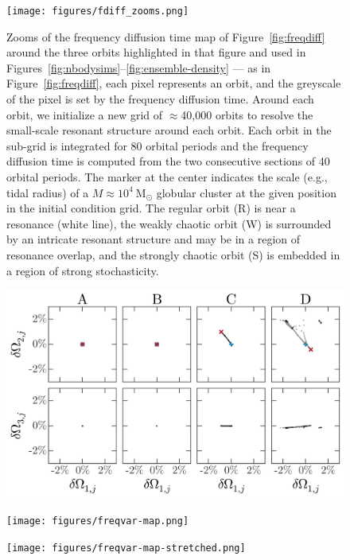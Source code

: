 \documentclass[letterpaper,12pt,preprint]{aastex}
\newcommand{\msun}{\ensuremath{\mathrm{M}_\odot}}
\begin{document}
\clearpage
\begin{figure}[p]
\begin{center}
\texttt{[image: figures/fdiff\_zooms.png]}
\caption{Zooms of the frequency diffusion time map of Figure~\ref{fig:freqdiff} around the three orbits highlighted in that figure and used in Figures~\ref{fig:nbodysims}--\ref{fig:ensemble-density} --- as in Figure~\ref{fig:freqdiff}, each pixel represents an orbit, and the greyscale of the pixel is set by the frequency diffusion time. Around each orbit, we initialize a new grid of $\approx$40,000 orbits to resolve the small-scale resonant structure around each orbit. Each orbit in the sub-grid is integrated for 80 orbital periods and the frequency diffusion time is computed from the two consecutive sections of 40 orbital periods. The marker at the center indicates the scale (e.g., tidal radius) of a $M \approx 10^4~\msun$ globular cluster at the given position in the initial condition grid. The regular orbit (R) is near a resonance (white line), the weakly chaotic orbit (W) is surrounded by an intricate resonant structure and may be in a region of resonance overlap, and the strongly chaotic orbit (S) is embedded in a region of strong stochasticity. }
\label{fig:fdiff-zooms}
\end{center}
\end{figure}

\clearpage
\begin{figure}[p]
\begin{center}
\includegraphics[width=\textwidth]{figures/freq-evolution.png}
\caption{ } 
\label{fig:three-orbits-freqs}
\end{center}
\end{figure}

\clearpage
\begin{figure}[p]
\begin{center}
\texttt{[image: figures/freqvar-map.png]}
\caption{ } 
\label{fig:freqvar_map}
\end{center}
\end{figure}

\clearpage
\begin{figure}[p]
\begin{center}
\texttt{[image: figures/freqvar-map-stretched.png]}
\caption{ } 
\label{fig:freqvar_map_stretched}
\end{center}
\end{figure}
\end{document}
